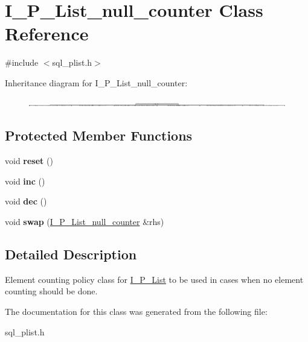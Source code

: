 \hypertarget{classI__P__List__null__counter}{}\section{I\+\_\+\+P\+\_\+\+List\+\_\+null\+\_\+counter Class Reference}
\label{classI__P__List__null__counter}


{\ttfamily \#include $<$sql\+\_\+plist.\+h$>$}

Inheritance diagram for I\+\_\+\+P\+\_\+\+List\+\_\+null\+\_\+counter\+:\begin{figure}[H]
\begin{center}
\leavevmode
\includegraphics[height=0.171254cm]{classI__P__List__null__counter}
\end{center}
\end{figure}
\subsection*{Protected Member Functions}
\begin{DoxyCompactItemize}
\item 
\mbox{\label{classI__P__List__null__counter_a4edf39883e54bae06a2c1dbe5fac5d27}} 
void {\bfseries reset} ()
\item 
\mbox{\label{classI__P__List__null__counter_a8d9ff3096b7f65a84ae06cc4ca8ed64d}} 
void {\bfseries inc} ()
\item 
\mbox{\label{classI__P__List__null__counter_a21310b1d30d9787454cb13b33f25c423}} 
void {\bfseries dec} ()
\item 
\mbox{\label{classI__P__List__null__counter_a1a77619c84521f5bd865196660373ece}} 
void {\bfseries swap} (\mbox{\hyperlink{classI__P__List__null__counter}{I\+\_\+\+P\+\_\+\+List\+\_\+null\+\_\+counter}} \&rhs)
\end{DoxyCompactItemize}


\subsection{Detailed Description}
Element counting policy class for \mbox{\hyperlink{classI__P__List}{I\+\_\+\+P\+\_\+\+List}} to be used in cases when no element counting should be done. 

The documentation for this class was generated from the following file\+:\begin{DoxyCompactItemize}
\item 
sql\+\_\+plist.\+h\end{DoxyCompactItemize}
